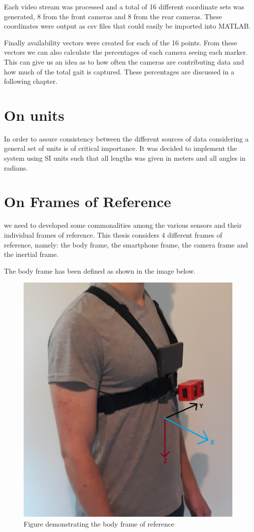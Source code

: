 Each video stream was processed and a total of 16 different coordinate sets was generated, 8 from the front cameras and 8 from the rear cameras. These coordinates were output as csv files that could easily be imported into MATLAB.


Finally availability vectors were created for each of the 16 points. 
From these vectors we can also calculate the percentages of each camera seeing each marker. This can give us an idea as to how often the cameras are contributing data and how much of the total gait is captured. These percentages are discussed in a following chapter.

\section{On units}
In order to assure consistency between the different sources of data considering a general set of units is of critical importance. It was decided to implement the system using SI units such that all lengths was given in meters and all angles in radians.

\section{On Frames of Reference}
we need to developed some commonalities among the various sensors and their individual frames of reference. This thesis considers 4 different frames of reference, namely: the body frame, the smartphone frame, the camera frame and the inertial frame.

The body frame has been defined as shown in the image below.

\begin{figure}[!ht] 
\captionsetup{width=0.8\linewidth, font=small}  
\includegraphics[width=0.5\linewidth]{figures/patbf.jpg}
\caption{Figure demonstrating the body frame of reference}
\label{fig:patbf}
\end{figure}

